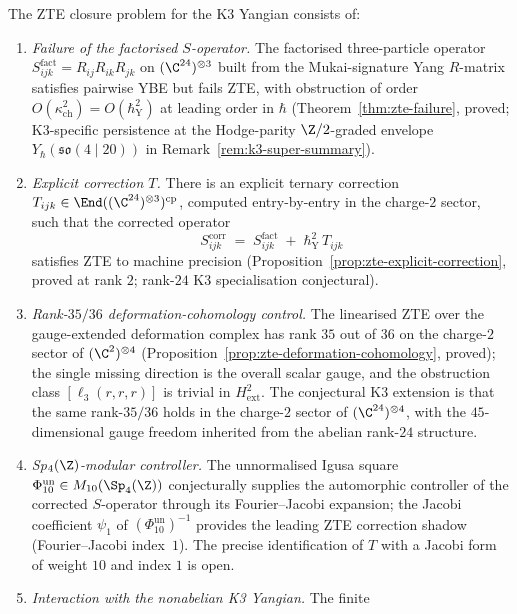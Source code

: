\begin{conjecture}
\label{conj:zte-closure-k3-yangian}
\ClaimStatusConjectured
The ZTE closure problem for the K3 Yangian consists of:
\begin{enumerate}[label=\textup{(Z\arabic*)}]
 \item \emph{Failure of the factorised $S$-operator.} The factorised three-particle operator $S^{\mathrm{fact}}_{ijk} = R_{ij} R_{ik} R_{jk}$ on $(\C^{24})^{\otimes 3}$ built from the Mukai-signature Yang $R$-matrix satisfies pairwise YBE but fails ZTE, with obstruction of order $O(\kappa_{\mathrm{ch}}^2) = O(\hbar_{\mathrm{Y}}^2)$ at leading order in $\hbar$ (Theorem~\ref{thm:zte-failure}, proved; K3-specific persistence at the Hodge-parity $\Z/2$-graded envelope $Y_\hbar(\mathfrak{so}(4 \mid 20))$ in Remark~\ref{rem:k3-super-summary}).
 \item \emph{Explicit correction $T$.} There is an explicit ternary correction $T_{ijk} \in \End((\C^{24})^{\otimes 3})^{\mathrm{cp}}$, computed entry-by-entry in the charge-$2$ sector, such that the corrected operator
 \[
 S^{\mathrm{corr}}_{ijk} \;=\; S^{\mathrm{fact}}_{ijk} \;+\; \hbar_{\mathrm{Y}}^2\, T_{ijk}
 \]
 satisfies ZTE to machine precision (Proposition~\ref{prop:zte-explicit-correction}, proved at rank $2$; rank-$24$ K3 specialisation conjectural).
 \item \emph{Rank-$35/36$ deformation-cohomology control.} The linearised ZTE over the gauge-extended deformation complex has rank $35$ out of $36$ on the charge-$2$ sector of $(\C^2)^{\otimes 4}$ (Proposition~\ref{prop:zte-deformation-cohomology}, proved); the single missing direction is the overall scalar gauge, and the obstruction class $[\ell_3(r, r, r)]$ is trivial in $H^2_{\mathrm{ext}}$. The conjectural K3 extension is that the same rank-$35/36$ holds in the charge-$2$ sector of $(\C^{24})^{\otimes 4}$, with the $45$-dimensional gauge freedom inherited from the abelian rank-$24$ structure.
 \item \emph{Sp$_4(\Z)$-modular controller.} The unnormalised Igusa square
 \(\Phi_{10}^{\mathrm{un}}\in M_{10}(\Sp_4(\Z))\) conjecturally supplies
 the automorphic controller of the corrected $S$-operator through its
 Fourier--Jacobi expansion; the Jacobi coefficient $\psi_1$ of
 \((\Phi_{10}^{\mathrm{un}})^{-1}\) provides the leading ZTE correction
 shadow (Fourier--Jacobi index~$1$). The precise identification of $T$
 with a Jacobi form of weight $10$ and index $1$ is open.
 \item \emph{Interaction with the nonabelian K3 Yangian.} The finite

\end{enumerate}
\end{conjecture}
